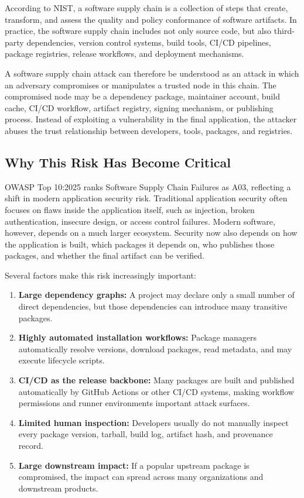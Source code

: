 \documentclass[12pt,a4paper]{article}
\begin{document}
According to NIST, a software supply chain is a collection of steps that create, transform, and assess the quality and policy conformance of software artifacts. In practice, the software supply chain includes not only source code, but also third-party dependencies, version control systems, build tools, CI/CD pipelines, package registries, release workflows, and deployment mechanisms.

A software supply chain attack can therefore be understood as an attack in which an adversary compromises or manipulates a trusted node in this chain. The compromised node may be a dependency package, maintainer account, build cache, CI/CD workflow, artifact registry, signing mechanism, or publishing process. Instead of exploiting a vulnerability in the final application, the attacker abuses the trust relationship between developers, tools, packages, and registries.

\subsection{Why This Risk Has Become Critical}

OWASP Top 10:2025 ranks Software Supply Chain Failures as A03, reflecting a shift in modern application security risk. Traditional application security often focuses on flaws inside the application itself, such as injection, broken authentication, insecure design, or access control failures. Modern software, however, depends on a much larger ecosystem. Security now also depends on how the application is built, which packages it depends on, who publishes those packages, and whether the final artifact can be verified.

Several factors make this risk increasingly important:

\begin{enumerate}[label=(\arabic*)]
  \item \textbf{Large dependency graphs:} A project may declare only a small number of direct dependencies, but those dependencies can introduce many transitive packages.
  \item \textbf{Highly automated installation workflows:} Package managers automatically resolve versions, download packages, read metadata, and may execute lifecycle scripts.
  \item \textbf{CI/CD as the release backbone:} Many packages are built and published automatically by GitHub Actions or other CI/CD systems, making workflow permissions and runner environments important attack surfaces.
  \item \textbf{Limited human inspection:} Developers usually do not manually inspect every package version, tarball, build log, artifact hash, and provenance record.
  \item \textbf{Large downstream impact:} If a popular upstream package is compromised, the impact can spread across many organizations and downstream products.
\end{enumerate}
\end{document}

